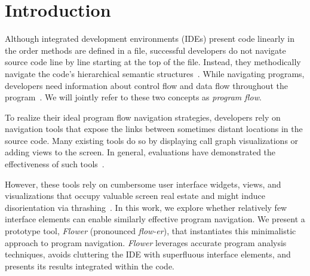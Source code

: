 \documentclass[conference]{IEEEtran}
\begin{document}



\section{Introduction}
%

Although integrated development environments (IDEs) present code linearly in the order methods are defined in a file, successful developers do not navigate source code line by line starting at the top of the file. 
Instead, they methodically navigate the code's hierarchical semantic structures~\cite{robillard2004investigate}.
While navigating programs, developers need information about control flow and data flow throughout the program~\cite{latoza2010hard, Smith2015}. 
We will jointly refer to these two concepts as \textit{program flow}. 

To realize their ideal program flow navigation strategies, developers rely on navigation tools that expose the links between sometimes distant locations in the source code. 
Many existing tools do so by displaying call graph visualizations or adding views to the screen.
In general, evaluations have demonstrated the effectiveness of such tools~\cite{Reacher,Whyline,Relo,Stacksplorer}.

However, these tools rely on cumbersome user interface widgets, views, and visualizations that occupy valuable screen real estate and might induce disorientation via thrashing~\cite{deAlwis2006disorient}.
In this work, we explore whether relatively few interface elements can enable similarly effective program navigation.
We present a prototype tool, \textit{Flower} (pronounced \textit{flow-er}), that instantiates this minimalistic approach to program navigation.
\textit{Flower} leverages accurate program analysis techniques, avoids cluttering the IDE with superfluous interface elements, and presents its results integrated within the code.
\end{document}
